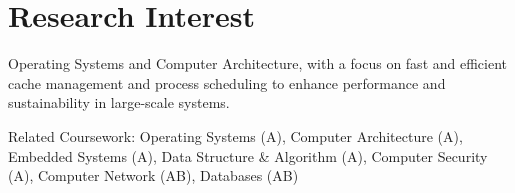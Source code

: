 \section{Research Interest}
\begin{onecolentry}
    Operating Systems and Computer Architecture,
    with a focus on fast and efficient cache management and process scheduling
    to enhance performance and sustainability in large-scale systems.
    \begin{highlights}
        \item  Related Coursework:
            Operating Systems (A),
            Computer Architecture (A),
            Embedded Systems (A),
            Data Structure \& Algorithm (A),
            Computer Security (A),
            Computer Network (AB),
            Databases (AB)
    \end{highlights}
\end{onecolentry}
